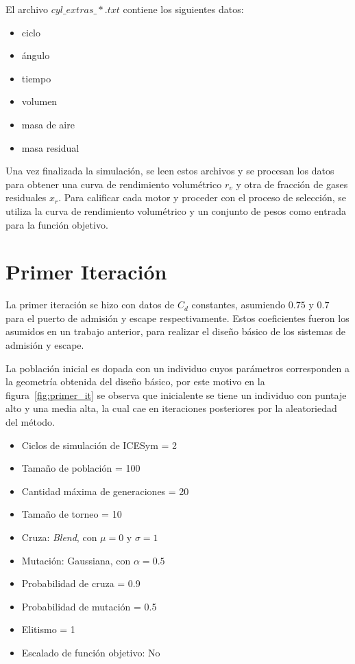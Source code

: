 El archivo \emph{$cyl\_extras\_*.txt$} contiene los siguientes datos:
\begin{itemize}
  \item ciclo
  \item ángulo
  \item tiempo
  \item volumen
  \item masa de aire
  \item masa residual
\end{itemize}

Una vez finalizada la simulación, se leen estos archivos y se procesan los datos
para obtener una curva de rendimiento volumétrico $r_{v}$ y otra de fracción de
gases residuales $x_{r}$.
%
Para calificar cada motor y proceder con el proceso de selección, se utiliza la
curva de rendimiento volumétrico y un conjunto de pesos como entrada para la
función objetivo.


\section{Primer Iteración}

La primer iteración se hizo con datos de $C_{d}$ constantes, asumiendo $0.75$ y
$0.7$ para el puerto de admisión y escape respectivamente.
%
Estos coeficientes fueron los asumidos en un trabajo anterior\cite{lopez13},
para realizar el diseño básico de los sistemas de admisión y escape.

La población inicial es dopada con un individuo cuyos parámetros corresponden a
la geometría obtenida del diseño básico\cite{lopez13}, por este motivo en la
figura~\ref{fig:primer_it} se observa que inicialente se tiene un individuo con
puntaje alto y una media alta, la cual cae en iteraciones posteriores por la
aleatoriedad del método.

\begin{itemize}
        \item Ciclos de simulación de ICESym = 2
        \item Tamaño de población = 100
        \item Cantidad máxima de generaciones = 20
        \item Tamaño de torneo =  10
        \item Cruza: \emph{Blend}, con $\mu = 0$ y $\sigma = 1$
        \item Mutación: Gaussiana, con $\alpha = 0.5$
        \item Probabilidad de cruza = 0.9
        \item Probabilidad de mutación = 0.5
        \item Elitismo = 1
        \item Escalado de función objetivo: No
\end{itemize}

